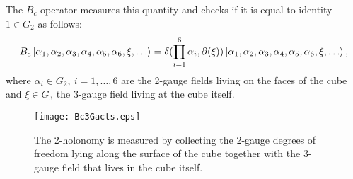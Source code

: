 \documentclass[titlepage,11pt]{article}
\theoremstyle{plain}%
\theoremstyle{definition}
\theoremstyle{remark}
\begin{document}
The $B_c$ operator measures this quantity and checks if it is equal to identity $1 \in G_2$ as follows:
\begin{align}
B_c\ket{\alpha_1,\alpha_2,\alpha_3,\alpha_4,\alpha_5,\alpha_6, \xi, \dots}=  
 \delta(\prod_{i=1}^{6} \alpha_i,\partial(\xi))\ket{\alpha_1,\alpha_2,\alpha_3,\alpha_4,\alpha_5,\alpha_6, \xi,\dots },
\end{align}
where $\alpha_i \in G_2,\ i=1,\dots, 6$ are the 2-gauge fields living on the faces of the cube and $\xi \in G_3$ the 3-gauge field living at the cube itself.
\begin{figure}[h!]
\centering
\texttt{[image: Bc3Gacts.eps]}
\caption{The 2-holonomy is measured by collecting the 2-gauge degrees of freedom lying along the surface of the cube together with the 3-gauge field that lives in the cube itself.}\label{fig:Bc3G}
\end{figure}
\end{document}
